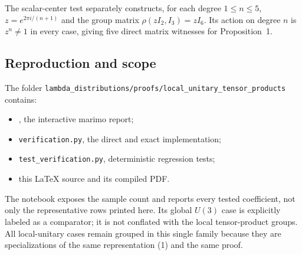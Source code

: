 \documentclass[10pt]{article}
\begin{document}
The scalar-center test separately constructs, for each degree $1\le n\le5$,
$z=e^{2\pi i/(n+1)}$ and the group matrix
$\rho(zI_2,I_3)=zI_6$. Its action on degree $n$ is $z^n\ne1$ in every case,
giving five direct matrix witnesses for Proposition~1.

\subsection{Reproduction and scope}

The folder \texttt{lambda\_distributions/proofs/local\_unitary\_tensor\_products} contains:
\begin{itemize}[leftmargin=1.5em]
 \item {}, the interactive marimo report;
 \item \texttt{verification.py}, the direct and exact implementation;
 \item \texttt{test\_verification.py}, deterministic regression tests;
 \item this \LaTeX{} source and its compiled PDF.
\end{itemize}
The notebook exposes the sample count and reports every tested coefficient, not
only the representative rows printed here. Its global $U(3)$ case is explicitly
labeled as a comparator; it is not conflated with the local tensor-product
groups. All local-unitary cases remain grouped in this single family because
they are specializations of the same representation (1) and the same proof.
\endgroup


\clearpage
\end{document}

